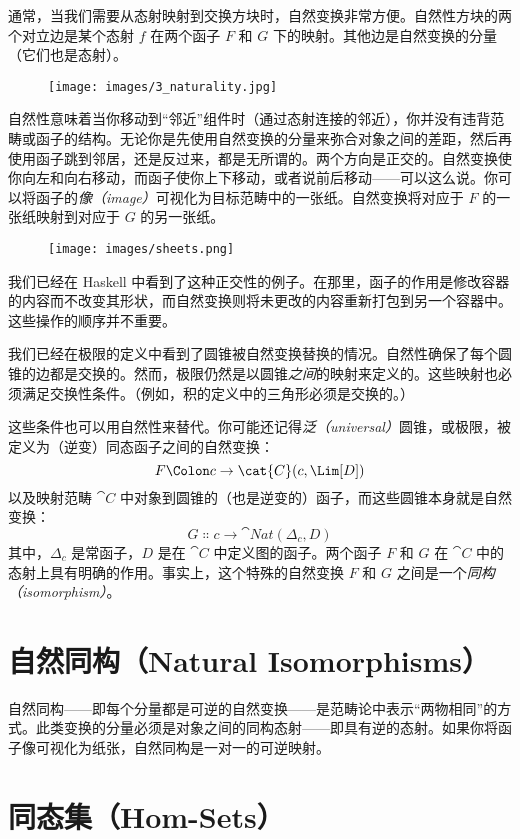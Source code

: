 通常，当我们需要从态射映射到交换方块时，自然变换非常方便。自然性方块的两个对立边是某个态射 $f$ 在两个函子 $F$ 和 $G$ 下的映射。其他边是自然变换的分量（它们也是态射）。

\begin{figure}[H]
  \centering
  \texttt{[image: images/3\_naturality.jpg]}
\end{figure}

\noindent
自然性意味着当你移动到“邻近”组件时（通过态射连接的邻近），你并没有违背范畴或函子的结构。无论你是先使用自然变换的分量来弥合对象之间的差距，然后再使用函子跳到邻居，还是反过来，都是无所谓的。两个方向是正交的。自然变换使你向左和向右移动，而函子使你上下移动，或者说前后移动——可以这么说。你可以将函子的\emph{像（image）}可视化为目标范畴中的一张纸。自然变换将对应于 $F$ 的一张纸映射到对应于 $G$ 的另一张纸。

\begin{figure}[H]
  \centering
  \texttt{[image: images/sheets.png]}
\end{figure}

\noindent
我们已经在 Haskell 中看到了这种正交性的例子。在那里，函子的作用是修改容器的内容而不改变其形状，而自然变换则将未更改的内容重新打包到另一个容器中。这些操作的顺序并不重要。

我们已经在极限的定义中看到了圆锥被自然变换替换的情况。自然性确保了每个圆锥的边都是交换的。然而，极限仍然是以圆锥\emph{之间}的映射来定义的。这些映射也必须满足交换性条件。（例如，积的定义中的三角形必须是交换的。）

这些条件也可以用自然性来替代。你可能还记得\emph{泛（universal）}圆锥，或极限，被定义为（逆变）同态函子之间的自然变换：
\[F \Colon c \to \cat{C}(c, \Lim[D])\]
以及映射范畴 $\cat{C}$ 中对象到圆锥的（也是逆变的）函子，而这些圆锥本身就是自然变换：
\[G \Colon c \to \cat{Nat}(\Delta_c, D)\]
其中，$\Delta_c$ 是常函子，$D$ 是在 $\cat{C}$ 中定义图的函子。两个函子 $F$ 和 $G$ 在 $\cat{C}$ 中的态射上具有明确的作用。事实上，这个特殊的自然变换 $F$ 和 $G$ 之间是一个\emph{同构（isomorphism）}。

\section{自然同构（Natural Isomorphisms）}

自然同构——即每个分量都是可逆的自然变换——是范畴论中表示“两物相同”的方式。此类变换的分量必须是对象之间的同构态射——即具有逆的态射。如果你将函子像可视化为纸张，自然同构是一对一的可逆映射。

\section{同态集（Hom-Sets）}


